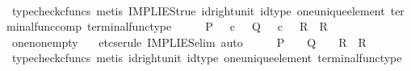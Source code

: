 \begin{isabellebody}
\ \ \ \ \isamarkupfalse%
\ {\isacharparenleft}{\kern0pt}typecheck{\isacharunderscore}{\kern0pt}cfuncs{\isacharcomma}{\kern0pt}\ metis\ IMPLIES{\isacharunderscore}{\kern0pt}true\ id{\isacharunderscore}{\kern0pt}right{\isacharunderscore}{\kern0pt}unit{}\ id{\isacharunderscore}{\kern0pt}type\ one{\isacharunderscore}{\kern0pt}unique{\isacharunderscore}{\kern0pt}element\ terminal{\isacharunderscore}{\kern0pt}func{\isacharunderscore}{\kern0pt}comp\ terminal{\isacharunderscore}{\kern0pt}func{\isacharunderscore}{\kern0pt}type{\isacharparenright}{\kern0pt}\isanewline
\ \ \isamarkupfalse%
\ \isamarkupfalse%
\ {\isachardoublequoteopen}{\isacharparenleft}{\kern0pt}P\ {\isacharequal}{\kern0pt}\ {\isasymt}\ {\isasymcirc}\isactrlsub c\ {\isasymbeta}\isactrlbsub {\isasymone}\isactrlesub {\isacharparenright}{\kern0pt}\ {\isasymLongrightarrow}\ {\isacharparenleft}{\kern0pt}{\isacharparenleft}{\kern0pt}Q\ {\isacharequal}{\kern0pt}\ {\isasymt}\ {\isasymcirc}\isactrlsub c\ {\isasymbeta}\isactrlbsub {\isasymone}\isactrlesub {\isacharparenright}{\kern0pt}\ {\isasymLongrightarrow}\ R{\isacharparenright}{\kern0pt}\ {\isasymLongrightarrow}\ R{\isachardoublequoteclose}\isanewline
\ \ \ \ \isamarkupfalse%
\ one{\isacharunderscore}{\kern0pt}nonempty\ \isamarkupfalse%
\ {\isacharparenleft}{\kern0pt}{\isacharminus}{\kern0pt}{\isacharcomma}{\kern0pt}\ etcs{\isacharunderscore}{\kern0pt}erule\ IMPLIES{\isacharunderscore}{\kern0pt}elim{\isacharcomma}{\kern0pt}\ auto{\isacharparenright}{\kern0pt}\isanewline
\ \ \isamarkupfalse%
\ \isamarkupfalse%
\ {\isachardoublequoteopen}{\isacharparenleft}{\kern0pt}P\ {\isacharequal}{\kern0pt}\ {\isasymt}{\isacharparenright}{\kern0pt}\ {\isasymLongrightarrow}\ {\isacharparenleft}{\kern0pt}{\isacharparenleft}{\kern0pt}Q\ {\isacharequal}{\kern0pt}\ {\isasymt}{\isacharparenright}{\kern0pt}\ {\isasymLongrightarrow}\ R{\isacharparenright}{\kern0pt}\ {\isasymLongrightarrow}\ R{\isachardoublequoteclose}\isanewline
\ \ \ \ \isamarkupfalse%
\ {\isacharparenleft}{\kern0pt}typecheck{\isacharunderscore}{\kern0pt}cfuncs{\isacharcomma}{\kern0pt}\ metis\ id{\isacharunderscore}{\kern0pt}right{\isacharunderscore}{\kern0pt}unit{}\ id{\isacharunderscore}{\kern0pt}type\ one{\isacharunderscore}{\kern0pt}unique{\isacharunderscore}{\kern0pt}element\ terminal{\isacharunderscore}{\kern0pt}func{\isacharunderscore}{\kern0pt}type{\isacharparenright}{\kern0pt}\isanewline
{}\isamarkupfalse%
%
\endisatagproof
{\isafoldproof}%

\end{isabellebody}
